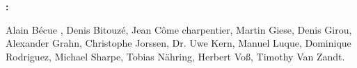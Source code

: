\textbf{:}

Alain Bécue ,
Denis Bitouzé,
Jean Côme charpentier,
Martin Giese,
Denis Girou,
Alexander Grahn,
Christophe Jorssen,
Dr. Uwe Kern,
Manuel Luque,
Dominique Rodriguez,
Michael Sharpe,
Tobias Nähring,
Herbert Voß,
Timothy Van Zandt.